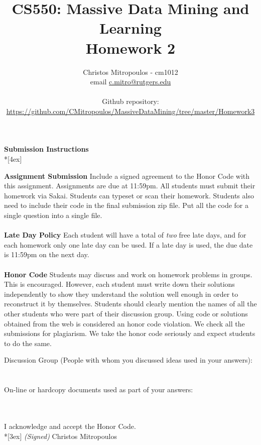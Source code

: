 \documentclass[11pt]{article}
\title{\LARGE{\bf \textsf{CS550: Massive Data Mining and Learning}}\\ {\bf \textsf{Homework 2}}}
\author{Christos Mitropoulos - cm1012 \\ email \href{mailto:c.mitro@rutgers.edu}{c.mitro@rutgers.edu} \\\\ Github repository:\\ \href{https://github.com/CMitropoulos/MassiveDataMining/tree/master/Homework3}{https://github.com/CMitropoulos/MassiveDataMining/tree/master/Homework3}}
\date{}
\begin{document}
\begin{titlepage}
\maketitle
\end{titlepage}

\pagebreak[4]
\begin{center}
\LARGE{\bf \textsf{Submission Instructions}} \\*[4ex]
\end{center}

\textbf{Assignment Submission } Include a signed agreement to the Honor Code with this assignment. Assignments are due at 11:59pm. All students must submit their homework via Sakai. Students can typeset or scan their homework. Students also need to include their code in the final submission zip file. Put all the code for a single question into a single file. 
\\
\\
\textbf{Late Day Policy } Each student will have a total of {\em two} free late days, and for each homework only one late day can be used. If a late day is used, the due date is 11:59pm on the next day.
\\
\\
\textbf{Honor Code } Students may discuss and work on homework problems in groups. This is encouraged. However, each student must write down their solutions independently to show they understand the solution well enough in order to reconstruct it by themselves.  Students should clearly mention the names of all the other students who were part of their discussion group. Using code or solutions obtained from the web is considered an honor code violation. We check all the submissions for plagiarism. We take the honor code seriously and expect students to do the same. 

\vfill
\vfill

Discussion Group (People with whom you discussed ideas used in your answers): \\\\\\
On-line or hardcopy documents used as part of your answers: \\\\\\
\vfill

\vfill

I acknowledge and accept the Honor Code.\\*[3ex]
\bigskip
\textit{(Signed)}
Christos Mitropoulos 
\vfill
\vfill
\end{document}
